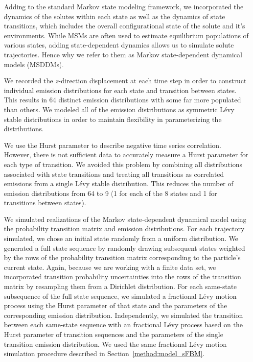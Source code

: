 \documentclass[journal=jctcce,manuscript=article]{achemso}
\begin{document}
  Adding to the standard Markov state modeling framework, we incorporated the 
  dynamics of the solutes within each state as well as the dynamics of state 
  transitions, which includes the overall configurational state of the solute
  and it's environments. While MSMs are often used to estimate equilibrium 
  populations of various states, adding state-dependent dynamics allows us to
  simulate solute trajectories. Hence why we refer to them as Markov state-dependent
  dynamical models (MSDDMs). 
  
  We recorded the $z$-direction displacement at each time step in order to
  construct individual emission distributions for each state and transition
  between states. This results in 64 distinct emission distributions with some
  far more populated than others. We modeled all of the emission distributions
  as symmetric L\'evy stable distributions in order to maintain flexibility in
  parameterizing the distributions.
  
  We use the Hurst parameter to describe negative time series correlation.
  However, there is not sufficient data to accurately measure a Hurst parameter
  for each type of transition. We avoided this problem by combining all
  distributions associated with state transitions and treating all transitions
  as correlated emissions from a single L\'evy stable distribution. This
  reduces the number of emission distributions from 64 to 9 (1 for each of the
  8 states and 1 for transitions between states).  
  
  We simulated realizations of the Markov state-dependent dynamical model 
  using the probability transition matrix and emission distributions. For each
  trajectory simulated, we chose an initial state randomly from a uniform 
  distribution. We generated a full state sequence by randomly drawing subsequent
  states weighted by the rows of the probability transition matrix corresponding
  to the particle's current state. Again, because we are working with a finite 
  data set, we incorporated transition probability uncertainties into the rows 
  of the transition matrix by resampling them from a Dirichlet distribution. For
  each same-state subsequence of the full state sequence, we simulated a fractional
  L\'evy motion process using the Hurst parameter of that state and the parameters 
  of the corresponding emission distribution. Independently, we simulated the 
  transition between each same-state sequence with an fractional L\'evy process 
  based on the Hurst parameter of transition sequences and the parameters of the
  single transition emission distribution. We used the same fractional L\'evy
  motion simulation procedure described in Section~\ref{method:model_sFBM}.
\end{document}
